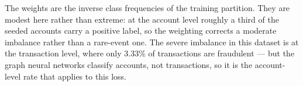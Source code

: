 The weights are the inverse class frequencies of the training partition. They are modest here rather than extreme: at the account level roughly a third of the seeded accounts carry a positive label, so the weighting corrects a moderate imbalance rather than a rare-event one. The severe imbalance in this dataset is at the transaction level, where only 3.33\% of transactions are fraudulent --- but the graph neural networks classify accounts, not transactions, so it is the account-level rate that applies to this loss.
